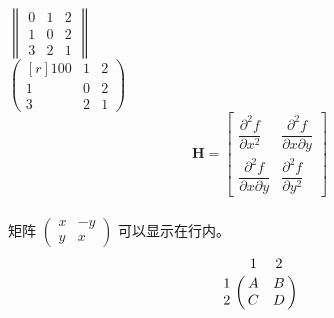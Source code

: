 \documentclass[]{ctexart}
\begin{document}
	\centering $\begin{Vmatrix} 0 & 1 & 2 \\ 1 & 0 & 2 \\ 3 & 2 & 1\end{Vmatrix} 	$ \\
	
	\centering $\begin{pmatrix*}[r] 100 & 1 & 2 \\ 1 & 0 & 2 \\ 3 & 2 & 1\end{pmatrix*} 	$ \\
	
	\[
		\mathbf{H} = 
		\begin{bmatrix}
			\dfrac{\partial^2 f}{\partial x^2} & 
			\dfrac{\partial^2 f}{\partial x \partial y} \\
			\dfrac{\partial^2 f}{\partial x \partial y} &
			\dfrac{\partial^2 f}{\partial y^2}
		\end{bmatrix}
	\] \\
	
	矩阵 $\left(\begin{smallmatrix} x & -y \\ y & x\end{smallmatrix}\right)$ 可以显示在行内。 \\
	
	\[
		\bordermatrix{
			& 1 & 2 \cr
		1 & A & B \cr
		2 & C & D \cr
		}
	\]
	
\end{document}
